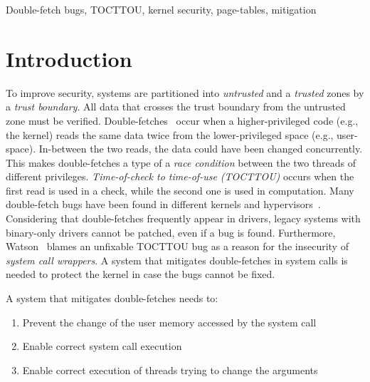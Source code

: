 \documentclass[conference]{IEEEtran}
\begin{document}
\begin{IEEEkeywords}
Double-fetch bugs, TOCTTOU, kernel security, page-tables, mitigation
\end{IEEEkeywords}

\section{Introduction}


To improve security, systems are partitioned into \emph{untrusted} and a
\emph{trusted} zones by a \emph{trust boundary}. All data that crosses the trust
boundary from the untrusted zone must be verified.
Double-fetches~\cite{serna08doublefetch, twizsgrakky07ring0, wilhelm2016xenpwn,
wang2018survey} occur when a higher-privileged code (e.g., the kernel) reads the
same data twice from the lower-privileged space (e.g., user-space). In-between
the two reads, the data could have been changed concurrently. This makes
double-fetches a type of a \emph{race condition} between the two threads of
different privileges. \emph{Time-of-check to time-of-use (TOCTTOU)} occurs when
the first read is used in a check, while the second one is used in computation.
Many double-fetch bugs have been found in different kernels and
hypervisors~\cite{cve201812633, cve202012652, cve20131332, cve201920610,
cve20158550, cve201610439, cve201610435, cve201610433, cve20195519,
cve20168438}. Considering that double-fetches frequently appear in drivers,
legacy systems with binary-only drivers cannot be patched, even if a bug is
found. Furthermore, Watson~\cite{watson2007} blames an unfixable TOCTTOU bug as
a reason for the insecurity of \emph{system call wrappers}. A system that
mitigates double-fetches in system calls is needed to protect the kernel in case
the bugs cannot be fixed.


A system that mitigates double-fetches needs to:
\begin{enumerate}
  \item Prevent the change of the user memory accessed by the system call
  \item Enable correct system call execution
  \item Enable correct execution of threads trying to change the arguments
\end{enumerate}
\end{document}
